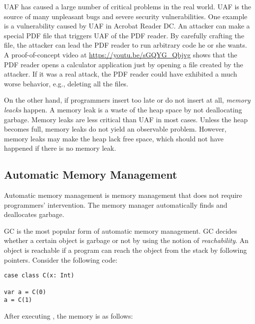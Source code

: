 UAF has caused a large number of critical problems in the real world. UAF is the
source of many unpleasant bugs and severe security vulnerabilities.  One example
is a vulnerability caused by UAF in Acrobat Reader
DC.
An attacker can make a special PDF file that triggers UAF of the PDF reader. By
carefully crafting the file, the attacker can lead the PDF reader to run
arbitrary code he or she wants. A proof-of-concept video at
\url{https://youtu.be/sGQYG_Qbjvg} shows that the PDF reader opens a calculator
application just by opening a file created by the attacker. If it was a real
attack, the PDF reader could have exhibited a much worse behavior, e.g.,
deleting all the files.

On the other hand, if programmers insert  too late or do not insert
at all, \textit{memory leacks} happen. A memory leak is a
waste of the heap space by not deallocating garbage. Memory leaks are less
critical than UAF in most cases. Unless the heap becomes full, memory leaks do
not yield an observable problem. However, memory leaks may make the heap lack
free space, which should not have happened if there is no memory leak.

\subsection{Automatic Memory Management}

Automatic memory management is memory management that does not require
programmers' intervention. The memory manager automatically finds and
deallocates garbage.

GC is the most popular form of automatic memory management. GC decides whether
a certain object is garbage or not by using the notion of
\textit{reachability}. An object is reachable if a program
can reach the object from the stack by following pointers. Consider the
following code:

\begin{verbatim}
case class C(x: Int)

var a = C(0)
a = C(1)
\end{verbatim}

After executing , the memory is as follows:

